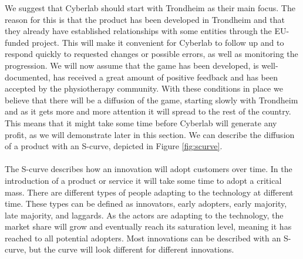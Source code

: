 We suggest that Cyberlab should start with Trondheim as their main focus. The reason for this is that the product has been developed in Trondheim and that they already have established relationships with some entities through the EU- funded project. This will make it convenient for Cyberlab to follow up and to respond quickly to requested changes or possible errors, as well as monitoring the progression. We will now assume that the game has been developed, is well-documented, has received a great amount of positive feedback and has been accepted by the physiotherapy community. With these conditions in place we believe that there will be a diffusion of the game, starting slowly with Trondheim and as it gets more and more attention it will spread to the rest of the country. This means that it might take some time before Cyberlab will generate any profit, as we will demonstrate later in this section. We can describe the diffusion of a product with an S-curve, depicted in Figure \ref{fig:scurve}. \\ \\
The S-curve describes how an innovation will adopt customers over time. In the introduction of a product or service it will take some time to adopt a critical mass. There are different types of people adapting to the technology at different time. These types can be defined as innovators, early adopters, early majority, late majority, and laggards. As the actors are adapting to the technology, the market share will grow and eventually reach its saturation level, meaning it has reached to all potential adopters. Most innovations can be described with an S-curve, but the curve will look different for different innovations\cite{scurve}.\\ \\
